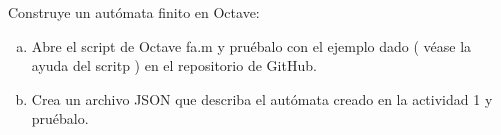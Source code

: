 Construye un autómata finito en Octave:

\begin{enumerate}[a)]
  \item Abre el script de Octave fa.m y pruébalo con el ejemplo dado ( véase la ayuda del scritp ) en el repositorio de GitHub.
  \item Crea un archivo JSON que describa el autómata creado en la actividad 1 y pruébalo.
\end{enumerate}
